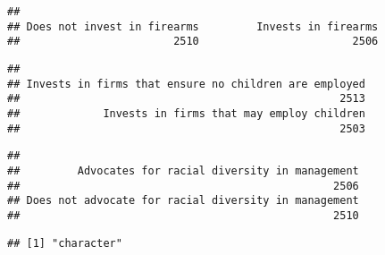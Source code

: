 \documentclass[
]{article}
\newenvironment{Shaded}{\begin{snugshade}}{\end{snugshade}}
\newcommand{\CommentTok}[1]{\textcolor[rgb]{0.56,0.35,0.01}{\textit{#1}}}
\newcommand{\FunctionTok}[1]{\textcolor[rgb]{0.00,0.00,0.00}{#1}}
\newcommand{\NormalTok}[1]{#1}
\newcommand{\SpecialCharTok}[1]{\textcolor[rgb]{0.00,0.00,0.00}{#1}}
\begin{document}
\begin{verbatim}
## 
## Does not invest in firearms         Invests in firearms 
##                        2510                        2506
\end{verbatim}

\begin{Shaded}
\end{Shaded}

\begin{verbatim}
## 
## Invests in firms that ensure no children are employed 
##                                                  2513 
##             Invests in firms that may employ children 
##                                                  2503
\end{verbatim}

\begin{Shaded}
\end{Shaded}

\begin{verbatim}
## 
##         Advocates for racial diversity in management 
##                                                 2506 
## Does not advocate for racial diversity in management 
##                                                 2510
\end{verbatim}

\begin{Shaded}
\end{Shaded}

\begin{verbatim}
## [1] "character"
\end{verbatim}
\end{document}
